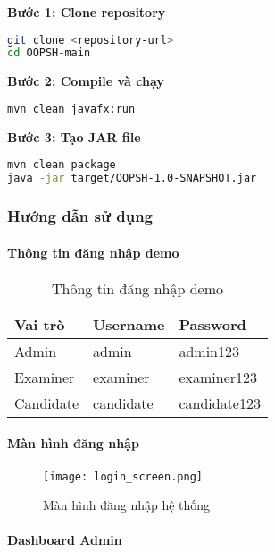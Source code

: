 \documentclass[12pt,a4paper]{article}
\begin{document}
\textbf{Bước 1: Clone repository}
\begin{lstlisting}[language=bash]
git clone <repository-url>
cd OOPSH-main
\end{lstlisting}

\textbf{Bước 2: Compile và chạy}
\begin{lstlisting}[language=bash]
mvn clean javafx:run
\end{lstlisting}

\textbf{Bước 3: Tạo JAR file}
\begin{lstlisting}[language=bash]
mvn clean package
java -jar target/OOPSH-1.0-SNAPSHOT.jar
\end{lstlisting}

\subsubsection{Hướng dẫn sử dụng}

\paragraph{Thông tin đăng nhập demo}

\begin{table}[H]
\centering
\caption{Thông tin đăng nhập demo}
\label{tab:login_info}
\begin{tabular}{|l|l|l|}
\hline
\textbf{Vai trò} & \textbf{Username} & \textbf{Password} \\
\hline
Admin & admin & admin123 \\
\hline
Examiner & examiner & examiner123 \\
\hline
Candidate & candidate & candidate123 \\
\hline
\end{tabular}
\end{table}

\paragraph{Màn hình đăng nhập}

\begin{figure}[H]
\centering
\texttt{[image: login\_screen.png]}
\caption{Màn hình đăng nhập hệ thống}
\label{fig:login_screen}
\end{figure}

\paragraph{Dashboard Admin}
\end{document}
